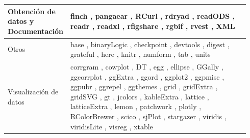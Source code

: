 \begin{table}
\begin{tabular}{>{\RaggedRight}m{0.14\linewidth}>{\RaggedRight}m{0.8\linewidth}}
Obtención de datos y Documentación & finch \autocite{finch}, pangaear \autocite{pangaear}, RCurl \autocite{RCurl}, rdryad \autocite{rdryad}, readODS \autocite{readODS}, readr \autocite{readr}, readxl \autocite{readxl}, rfigshare \autocite{rfigshare}, rgbif \autocite{rgbif}, rvest \autocite{rvest}, XML \autocite{XML} \\ \midrule
Otros & base \autocite{base}, binaryLogic \autocite{binaryLogic}, checkpoint \autocite{checkpoint}, devtools \autocite{devtools}, digest \autocite{digest}, grateful \autocite{grateful}, here \autocite{here}, knitr \autocite{knitr}, numform \autocite{numform}, tab \autocite{tab}, units \autocite{units} \\ \midrule
Visualización de datos & corrgram \autocite{corrgram}, cowplot \autocite{cowplot}, DT \autocite{DT}, egg \autocite{egg}, ellipse \autocite{ellipse}, GGally \autocite{GGally}, ggcorrplot \autocite{ggcorrplot}, ggExtra \autocite{ggExtra}, ggord \autocite{ggord}, ggplot2 \autocite{ggplot2}, ggpmisc \autocite{ggpmisc}, ggpubr \autocite{ggpubr}, ggrepel \autocite{ggrepel}, ggthemes \autocite{ggthemes}, grid \autocite{base}, gridExtra \autocite{gridExtra}, gridSVG \autocite{gridSVG}, gt \autocite{gt}, jcolors \autocite{jcolors}, kableExtra \autocite{kableExtra}, lattice \autocite{lattice}, latticeExtra \autocite{latticeExtra}, lemon \autocite{lemon}, patchwork \autocite{patchwork}, plotly \autocite{plotly}, RColorBrewer \autocite{RColorBrewer}, scico \autocite{scico}, sjPlot \autocite{sjPlot}, stargazer \autocite{stargazer}, viridis \autocite{viridis}, viridisLite \autocite{viridisLite}, visreg \autocite{visreg}, xtable \autocite{xtable} \\ \bottomrule
\end{tabular}
\end{table}


